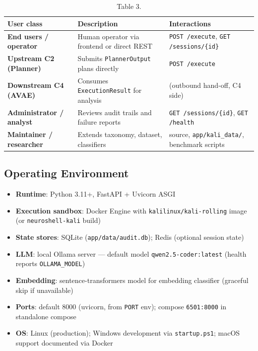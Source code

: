 \documentclass[10pt,journal,onecolumn]{IEEEtran}
\begin{document}
\begin{table}[h]
\caption{Table 3.}
\label{tab:t3}
\begin{tabularx}{\columnwidth}{l >{\raggedright\arraybackslash}X >{\raggedright\arraybackslash}X}
\toprule
\textbf{User class} & \textbf{Description} & \textbf{Interactions}\\
\midrule
\textbf{End users / operator} & Human operator via frontend or direct REST & \texttt{POST /execute}, \texttt{GET /sessions/\{id\}}\\
\textbf{Upstream C2 (Planner)} & Submits \texttt{PlannerOutput} plans directly & \texttt{POST /execute}\\
\textbf{Downstream C4 (AVAE)} & Consumes \texttt{ExecutionResult} for analysis & (outbound hand-off, C4 side)\\
\textbf{Administrator / analyst} & Reviews audit trails and failure reports & \texttt{GET /sessions/\{id\}}, \texttt{GET /health}\\
\textbf{Maintainer / researcher} & Extends taxonomy, dataset, classifiers & source, \texttt{app/kali\_data/}, benchmark scripts\\
\bottomrule
\end{tabularx}
\end{table}

\subsection{Operating Environment}

\begin{itemize}
\item \textbf{Runtime}: Python 3.11+, FastAPI + Uvicorn ASGI
\item \textbf{Execution sandbox}: Docker Engine with \texttt{kalilinux/kali-rolling} image (or \texttt{neuroshell-kali} build)
\item \textbf{State stores}: SQLite (\texttt{app/data/audit.db}); Redis (optional session state)
\item \textbf{LLM}: local Ollama server --- default model \texttt{qwen2.5-coder:latest} (health reports \texttt{OLLAMA\_MODEL})
\item \textbf{Embedding}: sentence-transformers model for embedding classifier (graceful skip if unavailable)
\item \textbf{Ports}: default 8000 (uvicorn, from \texttt{PORT} env); compose \texttt{6501:8000} in standalone compose
\item \textbf{OS}: Linux (production); Windows development via \texttt{startup.ps1}; macOS support documented via Docker
\end{itemize}
\end{document}
